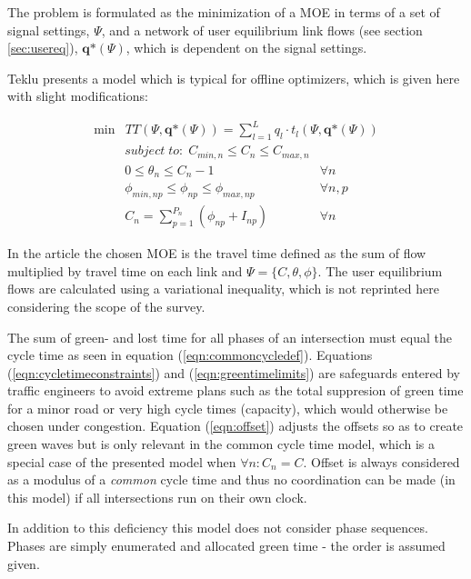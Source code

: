 The problem is formulated as the minimization of a MOE in terms of a
set of signal settings, $\Psi$, and a network of user equilibrium link
flows (see section \ref{sec:usereq}), $\textbf{q*}(\Psi)$, which is
dependent on the signal settings.

Teklu \cite{2} presents a model which is typical for offline optimizers, which is given here with slight modifications:

\begin{eqnarray}
\min & TT(\Psi, \textbf{q*}\left( \Psi\right)) = \displaystyle\sum_{l = 1}^{L} q_l \cdot t_l(\Psi,\textbf{q*}(\Psi))
\end{eqnarray}
\begin{eqnarray}
\label{eqn:cycletimeconstraints} subject\;to:\;C_{min,n} \leq C_n \leq C_{max,n} & \\
\label{eqn:offset} 0 \leq \theta_n \leq C_n-1 & \forall n \\
\label{eqn:greentimelimits} \phi_{min,np} \leq \phi_{np} \leq \phi_{max,np} & \forall n,p \\
\label{eqn:commoncycledef} C_n = \sum_{p=1}^{P_n} ( \phi_{np} + I_{np} ) & \forall n
\end{eqnarray}

In the article the chosen MOE is the travel time defined as the sum of
flow multiplied by travel time on each link and $\Psi = \lbrace
C,\theta,\phi \rbrace$. The user equilibrium flows are calculated
using a variational inequality, which is not reprinted here
considering the scope of the survey.

The sum of green- and lost time for all phases of an intersection must
equal the cycle time as seen in equation
(\ref{eqn:commoncycledef}). Equations (\ref{eqn:cycletimeconstraints})
and (\ref{eqn:greentimelimits}) are safeguards entered by traffic
engineers to avoid extreme plans such as the total suppresion of green
time for a minor road or very high cycle times (capacity), which would
otherwise be chosen under congestion. Equation (\ref{eqn:offset})
adjusts the offsets so as to create green waves but is only relevant
in the common cycle time model, which is a special case of the
presented model when $\forall n : C_n = C$. Offset is always
considered as a modulus of a \textit{common} cycle time and thus no
coordination can be made (in this model) if all intersections run on
their own clock.

In addition to this deficiency this model does not consider phase
sequences. Phases are simply enumerated and allocated green time - the
order is assumed given.

